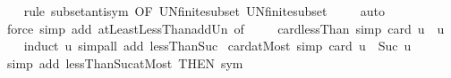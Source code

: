 \begin{isabellebody}
%
\isadelimproof
\ \ %
\endisadelimproof
%
\isatagproof
{}\isamarkupfalse%
\ {\isacharparenleft}{\kern0pt}rule\ subset{\isacharunderscore}{\kern0pt}antisym\ {\isacharbrackleft}{\kern0pt}OF\ UN{\isacharunderscore}{\kern0pt}finite{\isacharunderscore}{\kern0pt}subset\ UN{\isacharunderscore}{\kern0pt}finite{}{\isacharunderscore}{\kern0pt}subset{\isacharbrackright}{\kern0pt}{\isacharparenright}{\kern0pt}\isanewline
\ \ \ \isamarkupfalse%
\ auto\isanewline
\ \ \isamarkupfalse%
\ {\isacharparenleft}{\kern0pt}force\ simp\ add{\isacharcolon}{\kern0pt}\ atLeastLessThan{\isacharunderscore}{\kern0pt}add{\isacharunderscore}{\kern0pt}Un\ {\isacharbrackleft}{\kern0pt}of\ {}{\isacharbrackright}{\kern0pt}{\isacharparenright}{\kern0pt}{\isacharplus}{\kern0pt}\isanewline
\ \ \isamarkupfalse%
%
\endisatagproof
{\isafoldproof}%
%
\isadelimproof
%
\endisadelimproof
%
\isadelimdocument
%
\endisadelimdocument
%
\isatagdocument
%
\isamarkuptrue%
%
\endisatagdocument
{\isafolddocument}%
%
\isadelimdocument
%
\endisadelimdocument
{}\isamarkupfalse%
\ card{\isacharunderscore}{\kern0pt}lessThan\ {\isacharbrackleft}{\kern0pt}simp{\isacharbrackright}{\kern0pt}{\isacharcolon}{\kern0pt}\ {\isachardoublequoteopen}card\ {\isacharbraceleft}{\kern0pt}{\isachardot}{\kern0pt}{\isachardot}{\kern0pt}{\isacharless}{\kern0pt}u{\isacharbraceright}{\kern0pt}\ {\isacharequal}{\kern0pt}\ u{\isachardoublequoteclose}\isanewline
%
\isadelimproof
\ \ %
\endisadelimproof
%
\isatagproof
{}\isamarkupfalse%
\ {\isacharparenleft}{\kern0pt}induct\ u{\isacharcomma}{\kern0pt}\ simp{\isacharunderscore}{\kern0pt}all\ add{\isacharcolon}{\kern0pt}\ lessThan{\isacharunderscore}{\kern0pt}Suc{\isacharparenright}{\kern0pt}%
\endisatagproof
{\isafoldproof}%
%
\isadelimproof
\isanewline
%
\endisadelimproof
\isanewline
{}\isamarkupfalse%
\ card{\isacharunderscore}{\kern0pt}atMost\ {\isacharbrackleft}{\kern0pt}simp{\isacharbrackright}{\kern0pt}{\isacharcolon}{\kern0pt}\ {\isachardoublequoteopen}card\ {\isacharbraceleft}{\kern0pt}{\isachardot}{\kern0pt}{\isachardot}{\kern0pt}u{\isacharbraceright}{\kern0pt}\ {\isacharequal}{\kern0pt}\ Suc\ u{\isachardoublequoteclose}\isanewline
%
\isadelimproof
\ \ %
\endisadelimproof
%
\isatagproof
{}\isamarkupfalse%
\ {\isacharparenleft}{\kern0pt}simp\ add{\isacharcolon}{\kern0pt}\ lessThan{\isacharunderscore}{\kern0pt}Suc{\isacharunderscore}{\kern0pt}atMost\ {\isacharbrackleft}{\kern0pt}THEN\ sym{\isacharbrackright}{\kern0pt}{\isacharparenright}{\kern0pt}%

\end{isabellebody}
